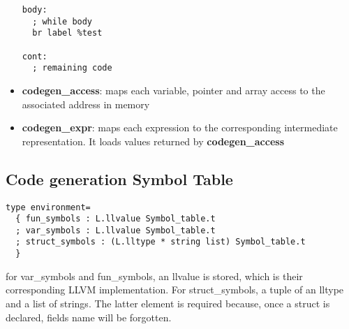 \documentclass{article}
\begin{document}
\begin{itemize}
\begin{minipage}{0.45\textwidth}
\begin{verbatim}
body:
  ; while body
  br label %test

cont:
  ; remaining code

\end{verbatim}
\end{minipage}





  \item \textbf{codegen\_access}: maps each variable, pointer and array access to the associated address in memory
  \item \textbf{codegen\_expr}: maps each expression to the corresponding intermediate representation. It loads
  values returned by \textbf{codegen\_access}
\end{itemize}

\subsection*{Code generation Symbol Table}
\begin{lstlisting}[linewidth=13.5cm, frame=single, basicstyle=\ttfamily\fontsize{8pt}{14pt}]
type environment=
  { fun_symbols : L.llvalue Symbol_table.t
  ; var_symbols : L.llvalue Symbol_table.t
  ; struct_symbols : (L.lltype * string list) Symbol_table.t
  }
\end{lstlisting}
for var\_symbols and fun\_symbols, an llvalue is stored, which is their corresponding LLVM implementation.
For struct\_symbols, a tuple of an lltype and a list of strings. The latter element is required because, once a struct is declared,
fields name will be forgotten.
\end{document}
